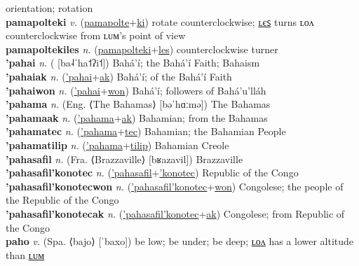 orientation; rotation \label{pamapoltelyan} \\
\textbf{pamapolteki} \textit{v.} (\hyperref[pamapolte]{pamapolte}+\hyperref[ki]{ki})
rotate counterclockwise; \hyperref[pamapoltekiles]{ʟєꜱ} turns ʟᴏᴧ counterclockwise from ʟᴜᴍ’s point of view \label{pamapolteki} \\
\textbf{pamapoltekiles} \textit{n.} (\hyperref[pamapolteki]{pamapolteki}+\hyperref[les]{les})
counterclockwise turner \label{pamapoltekiles} \\
\textbf{'pahai} \textit{n.} ( [ba˨ˈha˦ʔi˦])
Bahá’í; the Bahá’í Faith; Bahaism \label{'pahai} \\
\textbf{'pahaiak} \textit{n.} (\hyperref['pahai]{'pahai}+\hyperref[ak]{ak})
Bahá’í; of the Bahá’í Faith \label{'pahaiak} \\
\textbf{'pahaiwon} \textit{n.} (\hyperref['pahai]{'pahai}+\hyperref[won]{won})
Bahá’í; followers of Bahá’u’lláh \label{'pahaiwon} \\
\textbf{'pahama} \textit{n.} (Eng. ⟨The Bahamas⟩ [bəˈhɑːmə])
The Bahamas \label{'pahama} \\
\textbf{'pahamaak} \textit{n.} (\hyperref['pahama]{'pahama}+\hyperref[ak]{ak})
Bahamian; from the Bahamas \label{'pahamaak} \\
\textbf{'pahamatec} \textit{n.} (\hyperref['pahama]{'pahama}+\hyperref[tec]{tec})
Bahamian; the Bahamian People \label{'pahamatec} \\
\textbf{'pahamatilip} \textit{n.} (\hyperref['pahama]{'pahama}+\hyperref[tilip]{tilip})
Bahamian Creole \label{'pahamatilip} \\
\textbf{'pahasafil} \textit{n.} (Fra. ⟨Brazzaville⟩ [bʁazavil])
Brazzaville \label{'pahasafil} \\
\textbf{'pahasafil'konotec} \textit{n.} (\hyperref['pahasafil]{'pahasafil}+\hyperref['konotec]{'konotec})
Republic of the Congo \label{'pahasafil'konotec} \\
\textbf{'pahasafil'konotecwon} \textit{n.} (\hyperref['pahasafil'konotec]{'pahasafil'konotec}+\hyperref[won]{won})
Congolese; the people of the Republic of the Congo \label{'pahasafil'konotecwon} \\
\textbf{'pahasafil'konotecak} \textit{n.} (\hyperref['pahasafil'konotec]{'pahasafil'konotec}+\hyperref[ak]{ak})
Congolese; from Republic of the Congo \label{'pahasafil'konotecak} \\
\textbf{paho} \textit{v.} (Spa. ⟨bajo⟩ [ˈbaxo])
be low; be under; be deep; \hyperref[paholon]{ʟᴏᴧ} has a lower altitude than \hyperref[paholum]{ʟᴜᴍ} \label{paho} \\
